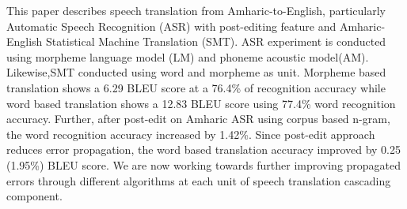 This paper describes speech translation from Amharic-to-English, particularly Automatic Speech Recognition (ASR) with post-editing feature and Amharic-English Statistical Machine Translation (SMT). ASR experiment is conducted using morpheme language model (LM) and phoneme acoustic model(AM). Likewise,SMT conducted using word and morpheme as unit. Morpheme based translation shows a 6.29 BLEU score at a 76.4\% of recognition accuracy while word based translation shows a 12.83 BLEU score using 77.4\% word recognition accuracy. Further, after post-edit on Amharic ASR using corpus based n-gram, the word recognition accuracy increased by 1.42\%. Since post-edit approach reduces error propagation, the word based translation accuracy improved by 0.25 (1.95\%) BLEU score. We are now working towards further improving propagated errors through different algorithms at each unit of speech translation cascading component.

